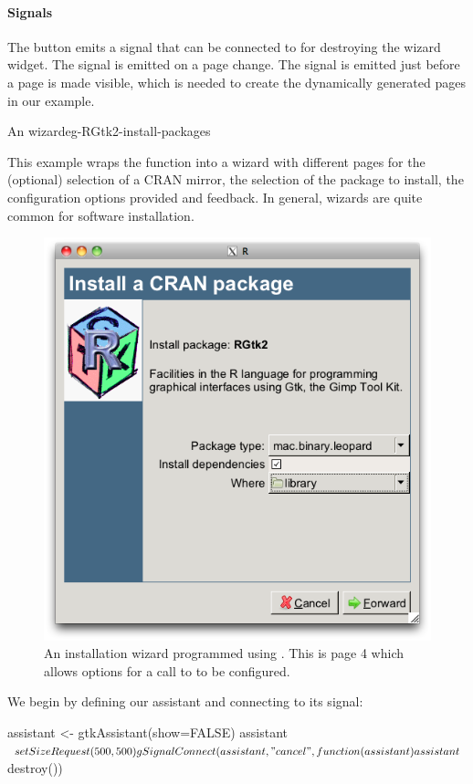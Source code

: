 \paragraph{Signals}
The  button emits a  signal that can be
connected to for destroying the wizard widget. The 
signal is emitted on a page change. The  signal is
emitted just before a page is made visible, which is needed to create
the dynamically generated pages in our example.

\begin{example}{An  wizard}{eg-RGtk2-install-packages}

This example wraps the  function into a
wizard with different pages for the (optional) selection of a CRAN
mirror, the selection of the package to install, the configuration
options provided and feedback. In general, wizards are quite common
for software installation.

\begin{figure}
  \centering
  \includegraphics[width=.6\textwidth]{fig-RGtk2-install-wizard.png}
  \caption{An installation wizard programmed using
    . This is page 4 which allows options for a
    call to  to be configured.}
  \label{fig:RGtk2-install-wizard}
\end{figure}


We begin by defining our assistant and connecting to its
 signal:
\begin{Schunk}
\begin{Sinput}
 assistant <- gtkAssistant(show=FALSE)
 assistant$setSizeRequest(500, 500)
 gSignalConnect(assistant, "cancel", 
                function(assistant) assistant$destroy())
\end{Sinput}
\end{Schunk}


\end{example}
